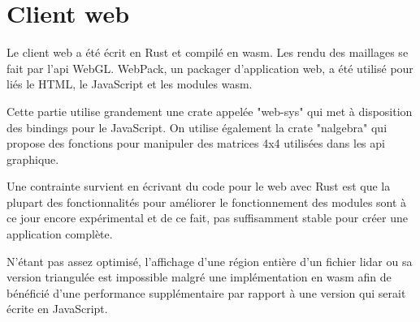 \section{Client web}

Le client web a été écrit en Rust et compilé en \gls{wasm}. Les rendu des
maillages se fait par l'api WebGL. WebPack, un packager d'application web, a été utilisé pour liés le HTML, le JavaScript et les modules \gls{wasm}. 

Cette partie utilise grandement une crate appelée "web-sys" qui met à disposition des bindings pour le JavaScript.
On utilise également la crate "nalgebra" qui propose des fonctions pour manipuler des matrices 4x4 utilisées dans les \gls{api} graphique.

Une contrainte survient en écrivant du code pour le web avec Rust est que la plupart des fonctionnalités pour améliorer le fonctionnement des modules sont à ce jour encore expérimental et de ce fait, pas suffisamment stable pour créer une application complète.

N'étant pas assez optimisé, l'affichage d'une région entière d'un fichier \gls{lidar} ou sa version triangulée est impossible malgré une implémentation en \gls{wasm} afin de bénéficié d'une performance supplémentaire par rapport à une version qui serait écrite en JavaScript.
